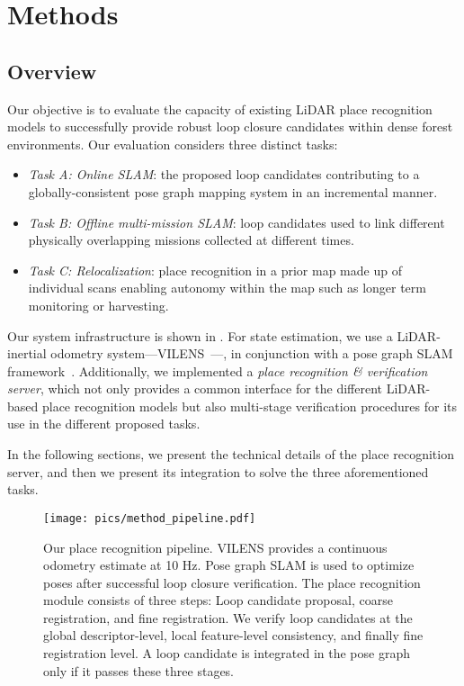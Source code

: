 \chapter{Methods}
\label{ch:methods}

\section{Overview}
\label{sec:overview}
Our objective is to evaluate the capacity of existing LiDAR place recognition models to successfully provide robust loop closure candidates within dense forest environments. Our evaluation considers three distinct tasks: 
\begin{itemize}
  \listparindent=-20pt
  \item \emph{Task A: Online SLAM}: the proposed loop candidates contributing to a globally-consistent pose graph mapping system in an incremental manner.
  \item \emph{Task B: Offline multi-mission SLAM}: loop candidates used to link different physically overlapping missions collected at different times.
  \item \emph{Task C: Relocalization}: place recognition in a prior map made up of individual scans enabling autonomy within the map such as longer term monitoring or harvesting.
\end{itemize}

Our system infrastructure is shown in . For state estimation, we use a LiDAR-inertial odometry system---VILENS~\cite{wisth2023tro}---, in conjunction with a pose graph SLAM framework~\cite{proudman2022ras}. Additionally, we implemented a \emph{place recognition \& verification server}, which not only provides a common interface for the different LiDAR-based place recognition models but also multi-stage verification procedures for its use in the different proposed tasks.

In the following sections, we present the technical details of the place recognition server, and then we present its integration to solve the three aforementioned tasks.


\begin{figure}[t]
  \centering
  \texttt{[image: pics/method\_pipeline.pdf]}
  \caption{Our place recognition pipeline. VILENS provides a continuous odometry estimate at 10 Hz. Pose graph SLAM is used to optimize poses after successful loop closure verification. 
  The place recognition module consists of three steps: Loop candidate proposal, coarse registration, and fine registration. We verify loop candidates
  at the global descriptor-level, local feature-level consistency, and finally fine registration level. A loop candidate is integrated in the pose graph only if it passes these three stages.}
  \label{fig:pipeline}
\end{figure}


